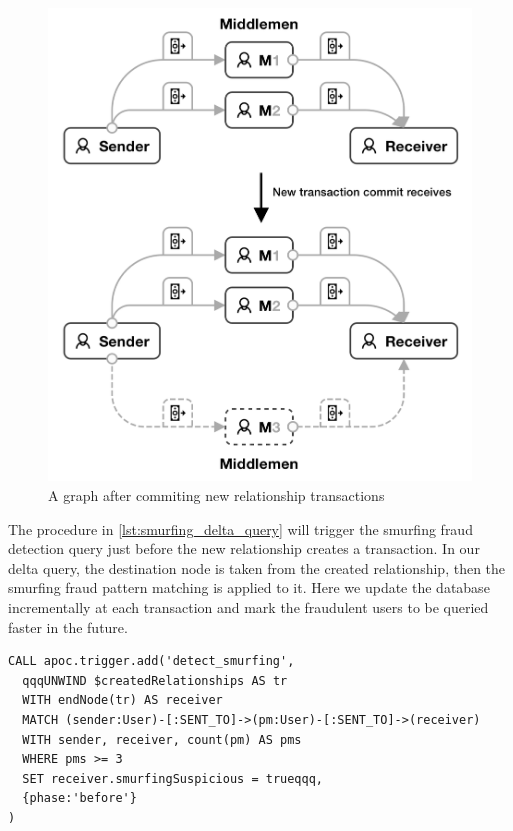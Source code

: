 \begin{figure}[!ht]
  \centering
  \includegraphics[scale=0.3]{figures/smurfing_incoming_transaction.png}
  \caption{A graph after commiting new relationship transactions}
  \label{fig:smurfing_incoming_transaction}
\end{figure}

The procedure in \autoref{lst:smurfing_delta_query} will trigger the smurfing fraud detection query just before the new relationship creates a transaction.
In our delta query, the destination node is taken from the created relationship, then the smurfing fraud pattern matching is applied to it.
Here we update the database incrementally at each transaction and mark the fraudulent users to be queried faster in the future.

\begin{lstlisting}[language=Cypher,frame=single,caption={Smurfing delta query procedure},label={lst:smurfing_delta_query}]
CALL apoc.trigger.add('detect_smurfing',
  qqqUNWIND $createdRelationships AS tr
  WITH endNode(tr) AS receiver
  MATCH (sender:User)-[:SENT_TO]->(pm:User)-[:SENT_TO]->(receiver)
  WITH sender, receiver, count(pm) AS pms
  WHERE pms >= 3
  SET receiver.smurfingSuspicious = trueqqq,
  {phase:'before'}
)
\end{lstlisting}

